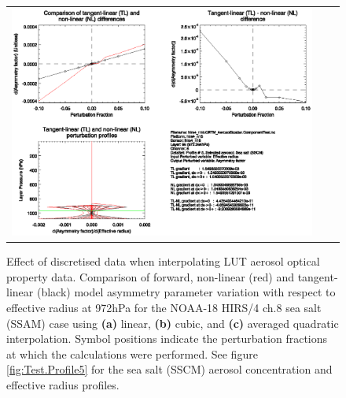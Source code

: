 \begin{figure}[htp]
\begin{tabular}{c c c}
    \includegraphics[bb=90 400 300 540,clip,scale=0.7]{graphics/Aerosol/TL/hirs4_n18.ch8.SSCM.AVGQUAD.dg_dReff.eps} 
  \end{tabular}
  \caption{Effect of discretised data when interpolating LUT aerosol optical property data. Comparison of forward, non-linear (red) and tangent-linear (black) model asymmetry parameter variation with respect to effective radius at 972hPa for the NOAA-18 HIRS/4 ch.8 sea salt (SSAM) case using \textbf{(a)} linear, \textbf{(b)} cubic, and \textbf{(c)} averaged quadratic interpolation. Symbol positions indicate the perturbation fractions at which the calculations were performed. See figure \ref{fig:Test.Profile5} for the sea salt (SSCM) aerosol concentration and effective radius profiles.}
  \label{fig:hirs4_n18.ch8.SSCM.dg_dReff}
\end{figure}

